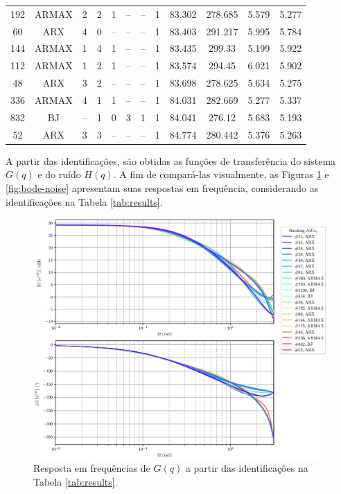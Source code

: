 \documentclass{ppgeesa}
\begin{document}
\begin{table}
\begin{tabularx}{\textwidth}{@{} c *{10}{C} c @{}}
    192  & ARMAX  & \num{2} & \num{2} & \num{1} &  --       &  --   & \num{1} & \num{83.302} & \num{278.685} & \num{5.579} & \num{5.277} \\
    60   & ARX    & \num{4} & \num{0} &  --     &  --       &  --   & \num{1} & \num{83.403} & \num{291.217} & \num{5.995} & \num{5.784} \\
    144  & ARMAX  & \num{1} & \num{4} & \num{1} &  --       &  --   & \num{1} & \num{83.435} & \num{299.33 } & \num{5.199} & \num{5.922} \\
    112  & ARMAX  & \num{1} & \num{2} & \num{1} &  --       &  --   & \num{1} & \num{83.574} & \num{294.45 } & \num{6.021} & \num{5.902} \\
    48   & ARX    & \num{3} & \num{2} &  --     &  --       &  --   & \num{1} & \num{83.698} & \num{278.625} & \num{5.634} & \num{5.275} \\
    336  & ARMAX  & \num{4} & \num{1} & \num{1} &  --       &  --   & \num{1} & \num{84.031} & \num{282.669} & \num{5.277} & \num{5.337} \\
    832  & BJ     &  --     & \num{1} & \num{0} & \num{3} & \num{1} & \num{1} & \num{84.041} & \num{276.12 } & \num{5.683} & \num{5.193} \\
    52   & ARX    & \num{3} & \num{3} &  --     &  --       &  --   & \num{1} & \num{84.774} & \num{280.442} & \num{5.376} & \num{5.263} \\
    \bottomrule
  \end{tabularx}
\end{table}

A partir das identificações, são obtidas as funções de transferência do sistema $G(q)$ e do ruído $H(q)$.
A fim de compará-las visualmente, as Figuras \ref{fig:bode-system} e \ref{fig:bode-noise} apresentam suas respostas em frequência, considerando as identificações na Tabela \ref{tab:results}.

\begin{figure}[!htbp]
  \centering
  \includegraphics[width=\linewidth]{bode_G_AICCv}
  \caption{Resposta em frequências de $G(q)$ a partir das identificações na Tabela \ref{tab:results}.}
  \label{fig:bode-system}
\end{figure}
\end{document}
